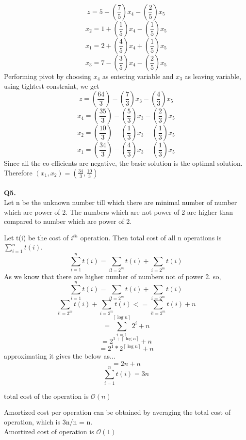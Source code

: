 \documentclass[11pt]{article}
\newcommand{\bigO}{\mathcal{O}}
\def\lc{\left\lceil}
\def\rc{\right\rceil}
\begin{document}
$$z = 5 + \left(\frac{7}{5}\right)x_4 - \left(\frac{2}{5}\right)x_5$$ 
$$x_2 = 1 + \left(\frac{1}{5}\right)x_4 - \left(\frac{1}{5}\right)x_5$$ 
$$x_1 = 2 + \left(\frac{4}{5}\right)x_4 + \left(\frac{1}{5}\right)x_5$$ 
$$x_3 = 7 - \left(\frac{3}{5}\right)x_4 - \left(\frac{2}{5}\right)x_5$$ 
Performing pivot by choosing $x_4$ as entering variable and $x_3$ as leaving variable, using tightest constraint, we get
$$z = \left(\frac{64}{3}\right) - \left(\frac{7}{3}\right)x_3 - \left(\frac{4}{3}\right)x_5$$ 
$$x_4 = \left(\frac{35}{3}\right) - \left(\frac{5}{3}\right)x_3 - \left(\frac{2}{3}\right)x_5$$ 
$$x_2 = \left(\frac{10}{3}\right) - \left(\frac{1}{3}\right)x_3 - \left(\frac{1}{3}\right)x_5$$ 
$$x_1 = \left(\frac{34}{3}\right) - \left(\frac{4}{3}\right)x_3 - \left(\frac{1}{3}\right)x_5$$
Since all the co-efficients are negative, the basic solution is the optimal solution. Therefore $(x_1,x_2) = \left(\frac{34}{3},\frac{10}{3}\right)$\\\\
\vspace{5mm}
\hline
\vspace{5mm}
\textbf{Q5.}\\
Let n be the unknown number till which there are minimal number of  number which are power of 2. The numbers which are not power of 2 are higher than compared to number which are power of 2. 

Let t(i) be the cost of $i^{th}$ operation. Then total cost of all n operations is $\sum_{i=1}^{n} t(i)$.
$$\sum_{i=1}^{n} t(i) = \sum_{i != 2^m} t(i) + \sum_{i = 2^m} t(i)$$
As we know that there are higher number of numbers not of power 2. so,
$$\sum_{i=1}^{n} t(i) = \sum_{i != 2^m} t(i) + \sum_{i = 2^m} t(i)$$
$$\sum_{i != 2^m} t(i) + \sum_{i = 2^m} t(i) <= \sum_{i != 2^m} t(i) + n$$
$$ =  \sum_{i=1}^{\lc \log n \rc} 2^i + n$$
$$ =  2^{1 +\lc \log n \rc}  + n$$
$$ =  2^{1}*2^{\lc \log n \rc}  + n$$
approximating it gives the below as...
$$ =  2n  + n$$
$$\sum_{i=1}^{n} t(i) = 3n$$

total cost of the operation is $\bigO(n)$

Amortized cost per operation can be obtained by averaging the total cost of operation, which is 3n/n = n.\\

Amortized cost of operation is $\bigO(1)$
\end{document}
